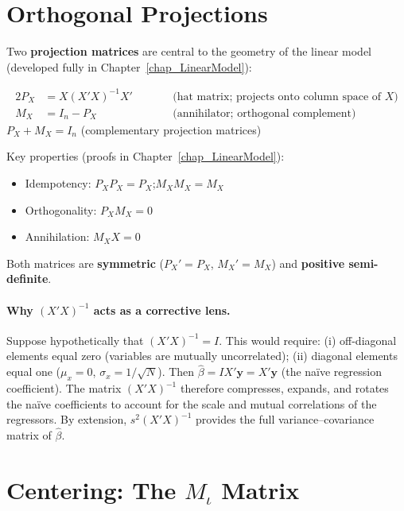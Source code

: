 \section{Orthogonal Projections}
\label{sec_Projections}

Two \textbf{projection matrices} are central to the
geometry of the linear model (developed fully in Chapter~\ref{chap_LinearModel}):

\begin{tcolorbox}[keyresult]
\begin{alignat*}{2}
  P_X &= X(X'X)^{-1}X'
    \qquad &&\text{(hat matrix; projects onto column space of }X\text{)} \\
  M_X &= I_n - P_X
    \qquad &&\text{(annihilator; orthogonal complement)}
\end{alignat*}
$P_X + M_X = I_n$ \quad (complementary projection matrices)
\end{tcolorbox}

Key properties (proofs in Chapter~\ref{chap_LinearModel}):
\begin{itemize}
  \item Idempotency: $P_X P_X = P_X$;\quad $M_X M_X = M_X$
  \item Orthogonality: $P_X M_X = 0$
  \item Annihilation: $M_X X = 0$
\end{itemize}

Both matrices are \textbf{symmetric} ($P_X' = P_X$, $M_X' = M_X$) and
\textbf{positive semi-definite}.

\paragraph{Why $(X'X)^{-1}$ acts as a corrective lens.} Suppose
hypothetically that $(X'X)^{-1} = I$. This would require: (i) off-diagonal
elements equal zero (variables are mutually uncorrelated); (ii) diagonal
elements equal one ($\mu_x = 0$, $\sigma_x = 1/\sqrt{N}$). Then $\hat\beta =
IX'\mathbf{y} = X'\mathbf{y}$ (the naïve regression coefficient). The matrix
$(X'X)^{-1}$ therefore compresses, expands, and rotates the naïve coefficients
to account for the scale and mutual correlations of the regressors.
By extension, $s^2(X'X)^{-1}$ provides the full variance--covariance matrix
of $\hat\beta$.


\section{Centering: The $M_\iota$ Matrix}
\label{sec_Centering}

